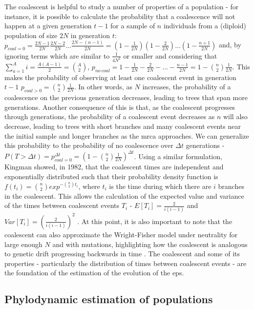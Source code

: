 The coalescent is helpful to study a number of properties of a population - for instance, it is possible to calculate the probability that a coalescence will not happen at a given generation $t-1$ for a sample of $n$ individuals from a (diploid) population of size $2N$ in generation $t$: $p_{coal=0} = \frac{2N-1}{2N}\frac{2N-2}{2N}...\frac{2N-(n-1)}{2N} = (1 - \frac{1}{2N})(1 - \frac{2}{2N})...(1 - \frac{n+1}{2N})$ and, by ignoring terms which are similar to $\frac{1}{4N^2}$ or smaller and considering that $\sum^A_{a=1}{i} = \frac{A(A-1)}{2} = \binom{A}{2}$, $p_{no\ coal} = 1 - \frac{1}{2N} - \frac{2}{2N} -...- \frac{n-1}{2N} = 1 - \binom{n}{2}\frac{1}{2N}$. This makes the probability of observing at least one coalescent event in generation $t-1$ $p_{coal>0} = \binom{n}{2}\frac{1}{2N}$. In other words, as $N$ increases, the probability of a coalescence on the previous generation decreases, leading to trees that span more generations. Another consequence of this is that, as the coalescent progresses through generations, the probability of a coalescent event decreases as $n$ will also decrease, leading to trees with short branches and many coalescent events near the initial sample and longer branches as the \ac{mrca} approaches. We can generalize this probability to the probability of no coalescence over $\Delta t$ generations - $P(T > \Delta t) = p_{coal=0}^{\Delta t} = (1-\binom{n}{2}\frac{1}{2N})^{\Delta t}$. Using a similar formulation, Kingman showed, in 1982, that the coalescent times are independent and exponentially distributed such that their probability density function is $f(t_i) = \binom{n}{2}exp^{-\binom{n}{2}t_i}$, where $t_i$ is the time during which there are $i$ branches in the coalescent. This allows the calculation of the expected value and variance of the times between coalescent events $T_i$ - $E[T_i] = \frac{2}{i(i-1)}$ and $Var[T_i] = (\frac{2}{i(i-1)})^2$ \cite{Kingman1982-tc}. At this point, it is also important to note that the coalescent can also approximate the Wright-Fisher model under neutrality for large enough $N$ and with mutations, highlighting how the coalescent is analogous to genetic drift progressing backwards in time \cite{Wakeley2008-wh}. The coalescent and some of its properties - particularly the distribution of times between coalescent events - are the foundation of the estimation of the evolution of the \ac{eps}.

\subsection{Phylodynamic estimation of populations}

